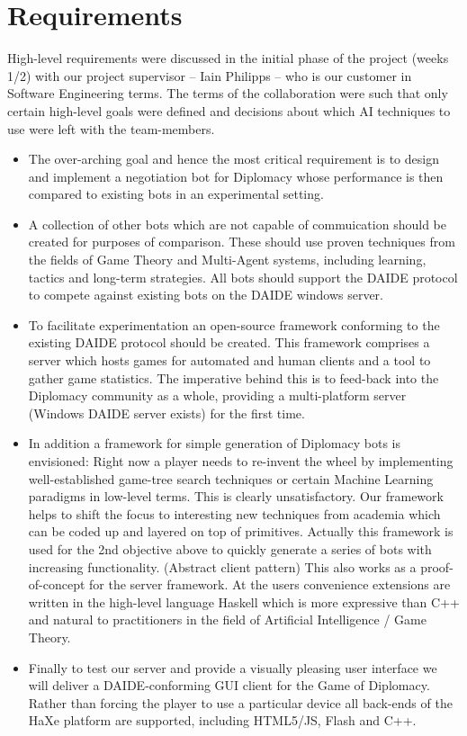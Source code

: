 \documentclass[11pt]{article} \usepackage{fullpage} \usepackage{cite}
\begin{document}
\section{Requirements}
High-level requirements were discussed in the initial phase of the project
(weeks 1/2) with our project supervisor -- Iain Philipps -- who is our customer
in Software Engineering terms. The terms of the collaboration were such that
only certain high-level goals were defined and decisions about which AI
techniques to use were left with the team-members.

\begin{itemize}

\item The over-arching goal and hence the most critical requirement is to design
  and implement a negotiation bot for Diplomacy whose performance is then
  compared to existing bots in an experimental setting.
\item A collection of other bots which are not capable of commuication should be
  created for purposes of comparison. These should use proven techniques from
  the fields of Game Theory and Multi-Agent systems, including learning, tactics
  and long-term strategies. All bots should support the DAIDE protocol to
  compete against existing bots on the DAIDE windows server.
\item To facilitate experimentation an open-source framework conforming to the
  existing DAIDE protocol should be created. This framework comprises a server
  which hosts games for automated and human clients and a tool to gather game
  statistics. The imperative behind this is to feed-back into the Diplomacy
  community as a whole, providing a multi-platform server (Windows DAIDE server
  exists) for the first time.
\item In addition a framework for simple generation of Diplomacy bots is
  envisioned: Right now a player needs to re-invent the wheel by implementing
  well-established game-tree search techniques or certain Machine Learning
  paradigms in low-level terms. This is clearly unsatisfactory. Our framework
  helps to shift the focus to interesting new techniques from academia which can
  be coded up and layered on top of primitives. Actually this framework is used
  for the 2nd objective above to quickly generate a series of bots with
  increasing functionality.  (Abstract client pattern) This also works as a
  proof-of-concept for the server framework. At the users convenience extensions
  are written in the high-level language Haskell which is more expressive than
  C++ and natural to practitioners in the field of Artificial Intelligence /
  Game Theory.
\item Finally to test our server and provide a visually pleasing user interface
  we will deliver a DAIDE-conforming GUI client for the Game of Diplomacy.
  Rather than forcing the player to use a particular device all back-ends of the
  HaXe platform are supported, including HTML5/JS, Flash and C++.

\end{itemize}
\end{document}

